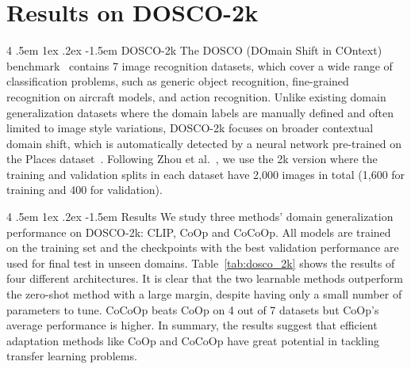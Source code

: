 \documentclass[10pt,twocolumn,letterpaper]{article}
\makeatletter
\renewcommand\paragraph{
  \@startsection{paragraph} {4} {\z@} {.5em \@plus1ex \@minus.2ex} {-1.5em} {\normalfont\normalsize\bfseries} }
\makeatother
\begin{document}
\section{Results on DOSCO-2k}

\paragraph{DOSCO-2k}
The DOSCO (DOmain Shift in COntext) benchmark~\cite{zhou2022device} contains 7 image recognition datasets, which cover a wide range of classification problems, such as generic object recognition, fine-grained recognition on aircraft models, and action recognition. Unlike existing domain generalization datasets where the domain labels are manually defined and often limited to image style variations, DOSCO-2k focuses on broader contextual domain shift, which is automatically detected by a neural network pre-trained on the Places dataset~\cite{zhou2017places}. Following Zhou et al.~\cite{zhou2022device}, we use the 2k version where the training and validation splits in each dataset have 2,000 images in total (1,600 for training and 400 for validation).

\paragraph{Results}
We study three methods' domain generalization performance on DOSCO-2k: CLIP, CoOp and CoCoOp. All models are trained on the training set and the checkpoints with the best validation performance are used for final test in unseen domains. Table~\ref{tab:dosco_2k} shows the results of four different architectures. It is clear that the two learnable methods outperform the zero-shot method with a large margin, despite having only a small number of parameters to tune. CoCoOp beats CoOp on 4 out of 7 datasets but CoOp's average performance is higher. In summary, the results suggest that efficient adaptation methods like CoOp and CoCoOp have great potential in tackling transfer learning problems.



{\small


}
\end{document}
